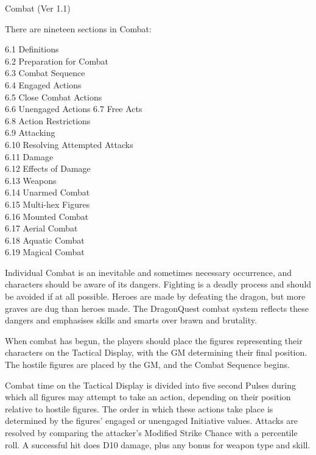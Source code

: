 \begin{Chapter}{Combat (Ver 1.1)}

There are nineteen sections in Combat: 

6.1   Definitions \\
6.2   Preparation for Combat \\
6.3   Combat Sequence \\
6.4   Engaged Actions \\
6.5   Close Combat Actions \\
6.6   Unengaged Actions 
6.7   Free Acts \\
6.8   Action Restrictions \\
6.9   Attacking \\
6.10   Resolving Attempted Attacks \\
6.11   Damage \\
6.12   Effects of Damage \\
6.13   Weapons \\
6.14   Unarmed Combat \\
6.15   Multi-hex Figures \\
6.16   Mounted Combat \\
6.17   Aerial Combat \\
6.18   Aquatic Combat \\
6.19   Magical Combat

Individual Combat is an inevitable and sometimes necessary occurrence,
and characters should be aware of its dangers.  Fighting is a deadly
process and should be avoided if at all possible. Heroes are made by
defeating the dragon, but more graves are dug than heroes made.  The
DragonQuest combat system reflects these dangers and emphasises skills
and smarts over brawn and brutality.

When combat has begun, the players should place the figures
representing their characters on the Tactical Display, with the GM
determining their final position. The hostile figures are placed by
the GM, and the Combat Sequence begins.

Combat time on the Tactical Display is divided into five second Pulses
during which all figures may attempt to take an action, depending on
their position relative to hostile figures.  The order in which these
actions take place is determined by the figures’ engaged or unengaged
Initiative values.  Attacks are resolved by comparing the attacker’s
Modified Strike Chance with a percentile roll.  A successful hit does
D10 damage, plus any bonus for weapon type and skill.


\end{Chapter}
